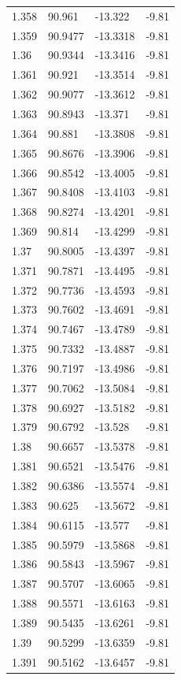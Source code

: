 \begin{tabular}{llll}
1.358 & 90.961 & -13.322 & -9.81 \\
1.359 & 90.9477 & -13.3318 & -9.81 \\
1.36 & 90.9344 & -13.3416 & -9.81 \\
1.361 & 90.921 & -13.3514 & -9.81 \\
1.362 & 90.9077 & -13.3612 & -9.81 \\
1.363 & 90.8943 & -13.371 & -9.81 \\
1.364 & 90.881 & -13.3808 & -9.81 \\
1.365 & 90.8676 & -13.3906 & -9.81 \\
1.366 & 90.8542 & -13.4005 & -9.81 \\
1.367 & 90.8408 & -13.4103 & -9.81 \\
1.368 & 90.8274 & -13.4201 & -9.81 \\
1.369 & 90.814 & -13.4299 & -9.81 \\
1.37 & 90.8005 & -13.4397 & -9.81 \\
1.371 & 90.7871 & -13.4495 & -9.81 \\
1.372 & 90.7736 & -13.4593 & -9.81 \\
1.373 & 90.7602 & -13.4691 & -9.81 \\
1.374 & 90.7467 & -13.4789 & -9.81 \\
1.375 & 90.7332 & -13.4887 & -9.81 \\
1.376 & 90.7197 & -13.4986 & -9.81 \\
1.377 & 90.7062 & -13.5084 & -9.81 \\
1.378 & 90.6927 & -13.5182 & -9.81 \\
1.379 & 90.6792 & -13.528 & -9.81 \\
1.38 & 90.6657 & -13.5378 & -9.81 \\
1.381 & 90.6521 & -13.5476 & -9.81 \\
1.382 & 90.6386 & -13.5574 & -9.81 \\
1.383 & 90.625 & -13.5672 & -9.81 \\
1.384 & 90.6115 & -13.577 & -9.81 \\
1.385 & 90.5979 & -13.5868 & -9.81 \\
1.386 & 90.5843 & -13.5967 & -9.81 \\
1.387 & 90.5707 & -13.6065 & -9.81 \\
1.388 & 90.5571 & -13.6163 & -9.81 \\
1.389 & 90.5435 & -13.6261 & -9.81 \\
1.39 & 90.5299 & -13.6359 & -9.81 \\
1.391 & 90.5162 & -13.6457 & -9.81 \\

\end{tabular}
